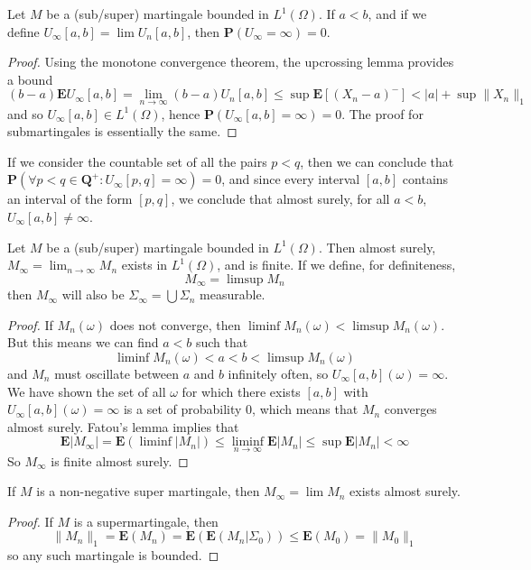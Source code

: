 \begin{corollary}
    Let $M$ be a (sub/super) martingale bounded in $L^1(\Omega)$. If $a < b$, and if we define $U_\infty[a,b] = \lim U_n[a,b]$, then $\mathbf{P}(U_\infty = \infty) = 0$.
\end{corollary}
\begin{proof}
    Using the monotone convergence theorem, the upcrossing lemma provides a bound
    \[ (b - a) \mathbf{E} U_\infty [a,b] = \lim_{n \to \infty} (b-a) U_n[a,b] \leq \sup \mathbf{E}[(X_n - a)^-] < |a| + \sup \| X_n \|_1 \]
    and so $U_\infty[a,b] \in L^1(\Omega)$, hence $\mathbf{P}(U_\infty[a,b] = \infty) = 0$. The proof for submartingales is essentially the same.
\end{proof}

If we consider the countable set of all the pairs $p < q$, then we can conclude that $\mathbf{P}(\forall p < q \in \mathbf{Q}^+: U_\infty[p,q] = \infty) = 0$, and since every interval $[a,b]$ contains an interval of the form $[p,q]$, we conclude that almost surely, for all $a < b$, $U_\infty[a,b] \neq \infty$.

\begin{theorem}
    Let $M$ be a (sub/super) martingale bounded in $L^1(\Omega)$. Then almost surely, $M_\infty = \lim_{n \to \infty} M_n$ exists in $L^1(\Omega)$, and is finite. If we define, for definiteness,
    \[ M_\infty = \limsup M_n \]
    then $M_\infty$ will also be $\Sigma_\infty = \bigcup \Sigma_n$ measurable.
\end{theorem}
\begin{proof}
    If $M_n(\omega)$ does not converge, then $\liminf M_n(\omega) < \limsup M_n(\omega)$. But this means we can find $a < b$ such that
    \[ \liminf M_n(\omega) < a < b < \limsup M_n(\omega) \]
    and $M_n$ must oscillate between $a$ and $b$ infinitely often, so $U_\infty[a,b](\omega) = \infty$. We have shown the set of all $\omega$ for which there exists $[a,b]$ with $U_\infty[a,b](\omega) = \infty$ is a set of probability 0, which means that $M_n$ converges almost surely. Fatou's lemma implies that
    \[ \mathbf{E}|M_\infty| = \mathbf{E}(\liminf |M_n|) \leq \liminf_{n \to \infty} \mathbf{E} |M_n| \leq \sup \mathbf{E}|M_n| < \infty \]
    So $M_\infty$ is finite almost surely.
\end{proof}

\begin{corollary}
    If $M$ is a non-negative super martingale, then $M_\infty = \lim M_n$ exists almost surely.
\end{corollary}
\begin{proof}
    If $M$ is a supermartingale, then
    \[ \|M_n\|_1 = \mathbf{E}(M_n) = \mathbf{E}(\mathbf{E}(M_n|\Sigma_0)) \leq \mathbf{E}(M_0) = \|M_0\|_1 \]
    so any such martingale is bounded.
\end{proof}

